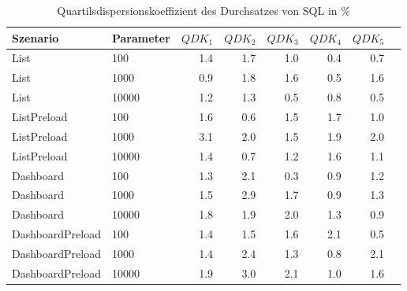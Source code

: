 
\begin{table}[ht]
\setlength{\extrarowheight}{-1pt}
\centering
\caption{Quartilsdispersionskoeffizient des Durchsatzes von SQL in \%}
\begin{tabular}{llrrrrrr}
\toprule
Szenario & Parameter & ${QDK_1}$ & ${QDK_2}$ & ${QDK_3}$& ${QDK_4}$ & ${QDK_5}$ \\
\midrule
	List & 100 &  1.4 &  1.7 &  1.0 &  0.4 &  0.7 \\
	List & 1000 &  0.9 &  1.8 &  1.6 &  0.5 &  1.6 \\
	List & 10000 &  1.2 &  1.3 &  0.5 &  0.8 &  0.5 \\
	ListPreload & 100 &  1.6 &  0.6 &  1.5 &  1.7 &  1.0 \\
	ListPreload & 1000 & \cellcolor{red!11}  3.1 & \cellcolor{red!11}  2.0 &  1.5 &  1.9 &  2.0 \\
	ListPreload & 10000 &  1.4 &  0.7 &  1.2 &  1.6 &  1.1 \\
	Dashboard & 100 &  1.3 & \cellcolor{red!11}  2.1 &  0.3 &  0.9 &  1.2 \\
	Dashboard & 1000 &  1.5 & \cellcolor{red!11}  2.9 &  1.7 &  0.9 &  1.3 \\
	Dashboard & 10000 &  1.8 &  1.9 &  2.0 &  1.3 &  0.9 \\
	DashboardPreload & 100 &  1.4 &  1.5 &  1.6 & \cellcolor{red!11}  2.1 &  0.5 \\
	DashboardPreload & 1000 &  1.4 & \cellcolor{red!11}  2.4 &  1.3 &  0.8 & \cellcolor{red!11}  2.1 \\
	DashboardPreload & 10000 &  1.9 & \cellcolor{red!11}  3.0 & \cellcolor{red!11}  2.1 &  1.0 &  1.6 \\
\bottomrule
\end{tabular}
\label{tab:quartilsdispersionskoeffizient_durchsatz_sql}
\end{table}
	